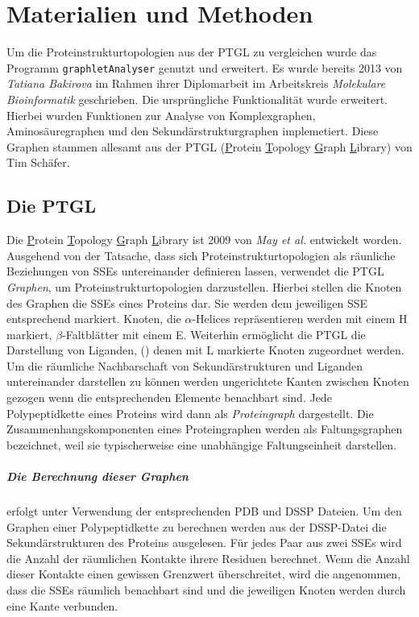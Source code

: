 \documentclass{report}
\begin{document}
\chapter{Materialien und Methoden}

Um die Proteinstrukturtopologien aus der PTGL zu vergleichen wurde das Programm \texttt{graphletAnalyser} genutzt und erweitert. Es wurde bereits 2013 von \textit{Tatiana Bakirova} im Rahmen ihrer Diplomarbeit im Arbeitskreis \textit{Molekulare Bioinformatik} geschrieben. Die urspr\"ungliche Funktionalität wurde erweitert. Hierbei wurden Funktionen zur Analyse von Komplexgraphen, Aminos\"auregraphen und den Sekund\"arstrukturgraphen implemetiert. Diese Graphen stammen allesamt aus der PTGL (\underline{P}rotein \underline{T}opology \underline{G}raph \underline{L}ibrary) von Tim Sch\"afer.


\section{Die PTGL}


Die \underline{P}rotein \underline{T}opology \underline{G}raph \underline{L}ibrary ist 2009 von \textit{May et al.} \cite{ptgl1} entwickelt worden. Ausgehend von der Tatsache, dass sich Proteinstrukturtopologien als r\"aunliche Beziehungen von SSEs untereinander definieren lassen, verwendet die PTGL \emph{Graphen}, um Proteinstrukturtopologien darzustellen.
Hierbei stellen die Knoten des Graphen die SSEs eines Proteins dar. Sie werden dem jeweiligen SSE entsprechend markiert. Knoten, die $\alpha$-Helices repr\"asentieren werden mit einem H markiert, $\beta$-Faltbl\"atter mit einem E. Weiterhin erm\"oglicht die PTGL die Darstellung von Liganden, (\cite{vplg}) denen mit L markierte Knoten zugeordnet werden. Um die r\"aumliche Nachbarschaft von Sekund\"arstrukturen und Liganden untereinander darstellen zu k\"onnen werden ungerichtete Kanten zwischen Knoten gezogen wenn die entsprechenden Elemente benachbart sind. Jede Polypeptidkette eines Proteins wird dann als \emph{Proteingraph} dargestellt. Die Zusammenhangskomponenten eines Proteingraphen werden als Faltungsgraphen bezeichnet, weil sie typischerweise eine unabh\"angige Faltungseinheit darstellen.

\paragraph{Die Berechnung dieser Graphen}

erfolgt unter Verwendung der entsprechenden PDB und DSSP Dateien. Um den Graphen einer Polypeptidkette zu berechnen werden aus der DSSP-Datei die Sekund\"arstrukturen des Proteins ausgelesen. F\"ur jedes Paar aus zwei SSEs wird die Anzahl der r\"aumlichen Kontakte ihrere Residuen berechnet. Wenn die Anzahl dieser Kontakte einen gewissen Grenzwert \"uberschreitet, wird die angenommen, dass die SSEs r\"aumlich benachbart sind und die jeweiligen Knoten werden durch eine Kante verbunden.
\end{document}
